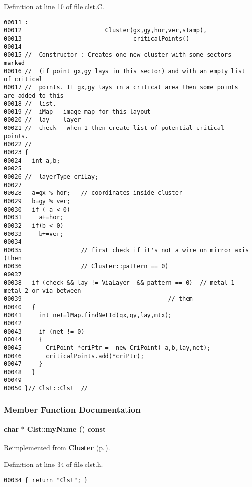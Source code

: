 Definition at line 10 of file clst.C.\small\begin{verbatim}00011 :
00012                        Cluster(gx,gy,hor,ver,stamp),
00013                                criticalPoints() 
00014 
00015 //  Constructor : Creates one new cluster with some sectors marked
00016 //  (if point gx,gy lays in this sector) and with an empty list of critical
00017 //  points. If gx,gy lays in a critical area then some points are added to this
00018 //  list.
00019 //  iMap - image map for this layout 
00020 //  lay  - layer
00021 //  check - when 1 then create list of potential critical points.
00022 // 
00023 {
00024   int a,b;
00025 
00026 //  layerType criLay;
00027 
00028   a=gx % hor;   // coordinates inside cluster
00029   b=gy % ver;
00030   if ( a < 0)
00031     a+=hor;
00032   if(b < 0)
00033     b+=ver;
00034 
00035                 // first check if it's not a wire on mirror axis (then
00036                 // Cluster::pattern == 0)
00037   
00038   if (check && lay != ViaLayer  && pattern == 0)  // metal 1 metal 2 or via between
00039                                          // them
00040   {
00041     int net=lMap.findNetId(gx,gy,lay,mtx);
00042 
00043     if (net != 0)
00044     {
00045       CriPoint *criPtr =  new CriPoint( a,b,lay,net);
00046       criticalPoints.add(*criPtr);
00047     }
00048   }
00049 
00050 }// Clst::Clst  //

\end{verbatim}\normalsize 


\subsubsection{Member Function Documentation}
\label{Clst_a4}
\paragraph{\setlength{\rightskip}{0pt plus 5cm}char $\ast$ Clst::my\-Name () const\hspace{0.3cm}{\tt  [inline, virtual]}}\hfill



Reimplemented from {\bf Cluster} {\rm (p.\,\pageref{Cluster_a4})}.

Definition at line 34 of file clst.h.\small\begin{verbatim}00034 { return "Clst"; }
\end{verbatim}\normalsize 
\label{Clst_a3}
